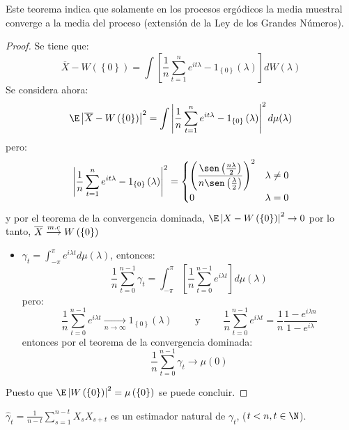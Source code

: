 Este teorema indica que solamente en los procesos erg\'{o}dicos la media muestral converge a la media del proceso (extensi\'{o}n de la Ley de los Grandes N\'{u}meros).

\begin{proof}

 Se tiene que:
\[
\overline{X}-W\left( \left\{ 0 \right\} \right)=\int {\left[ 
\frac{1}{n}\sum_{t=1}^n e^{it\lambda } -1_{\left\{ 0 \right\}}\left( 
\lambda \right) \right]dW(\lambda )} 
\]
Se considera ahora:
\[
\E\left| \overline{X}-W\left( \left\{ 0 \right\} \right) \right|^{2}=\int {\left| 
\frac{1}{n}\sum_{t=1}^n e^{it\lambda } -1_{\left\{ 0 \right\}}\left( 
\lambda \right) \right|^{2}d\mu (\lambda )} 
\]
pero:
\[
\left| \frac{1}{n}\sum_{t=1}^n e^{it\lambda } -1_{\left\{ 0 
\right\}}\left( \lambda \right) \right|^{2}
=\begin{cases}\displaystyle
  \left( \frac{\sen\left( \frac{n\lambda }{2} \right)}{n\sen\left( \frac{\lambda }{2} \right)} \right)^{2}& \lambda \neq 0 \\ 
  0 & \lambda=0
 \end{cases}
\]
y por el teorema de la convergencia dominada, $\E\left| X-W\left( \left\{ 0 
\right\} \right) \right|^{2}\to 0$ por lo tanto, $\overline{X}\buildrel {m.c} \over \longrightarrow W\left( \left\{ 0 \right\} \right)$

\begin{itemize}
\item $\gamma_{t} =\int_{-\pi }^\pi {e^{i\lambda t}d\mu \left( \lambda \right)}$, entonces:
\[
\frac{1}{n}\sum_{t=0}^{n-1} {\gamma_{t} =\int_{-\pi }^\pi 
{\left[ {\frac{1}{n}\sum_{t=0}^{n-1} {e^{i\lambda t}} } \right]d\mu 
\left( \lambda \right)} } 
\]
pero: 
\[
 \frac{1}{n}\sum_{t=0}^{n-1} {e^{i\lambda t}} 
\mathrel{\mathop{\longrightarrow}\limits_{n\to \infty }} 
1_{\left\{ 0 \right\}} \left( \lambda \right)\qquad\text{ y }\qquad \frac{1}{n}\sum_{t=0}^{n-1} 
{e^{i\lambda t}} =\frac{1}{n}\frac{1-e^{i\lambda n}}{1-e^{i\lambda }}
\]
entonces por el teorema de la convergencia dominada: 
\[
\frac{1}{n}\sum_{t=0}^{n-1} {\gamma_{t} } \to \mu (0)
\]
\end{itemize}
Puesto que $\E\left| W\left( \left\{ 0 \right\} \right) \right|^{2}=\mu \left( 
\left\{ 0 \right\} \right)$ se puede concluir.
\end{proof}

\begin{observacion}
$\displaystyle\widehat{{\gamma }}_{t} =\frac{1}{n-t}\sum_{s=1}^{n-t} {X_{s} X_{s+t} } $ es un estimador natural de $\gamma_{t}$, ($t<n,t\in \N$).
\end{observacion}

